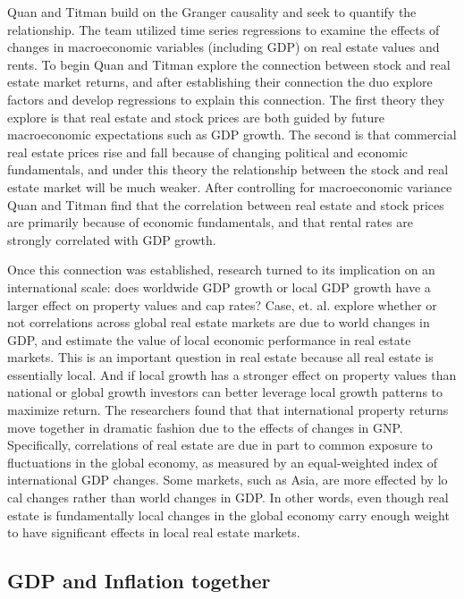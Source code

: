 Quan and Titman \citep{quan1997commercial} build on the Granger causality and seek to quantify the relationship. The team utilized time series regressions to examine the effects of changes in macroeconomic variables (including GDP) on real estate values and rents. To begin Quan and Titman explore the connection between stock and real estate market returns, and after establishing their connection the duo explore factors and develop regressions to explain this connection. The first theory they explore is that real estate and stock prices are both guided by future macroeconomic expectations such as GDP growth. The second is that commercial real estate prices rise and fall because of changing political and economic fundamentals, and under this theory the relationship between the stock and real estate market will be much weaker. After controlling for macroeconomic variance Quan and Titman find that the correlation between real estate and stock prices are primarily because of economic fundamentals, and that rental rates are strongly correlated with GDP growth.

Once this connection was established, research turned to its implication on an international scale: does worldwide GDP growth or local GDP growth have a larger effect on property values and cap rates? Case, et. al. \citep*{case2000global} explore whether or not correlations across global real estate markets are due to world changes in GDP, and estimate the value of local economic performance in real estate markets. This is an important question in real estate because all real estate is essentially local. And if local growth has a stronger effect on property values than national or global growth investors can better leverage local growth patterns to maximize return. The researchers found that that international property returns move together in dramatic fashion due to the effects of changes in GNP. Specifically, correlations of real estate are due in part to common exposure to fluctuations in the global economy, as measured by an equal-weighted index of international GDP changes. Some markets, such as Asia, are more effected by lo cal changes rather than world changes in GDP. In other words, even though real estate is fundamentally local changes in the global economy carry enough weight to have significant effects in local real estate markets.

\subsection{GDP and Inflation together}

